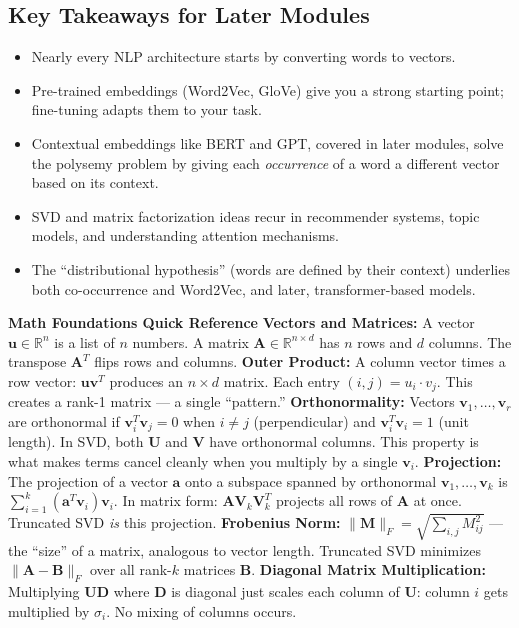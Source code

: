 \documentclass[11pt]{article}
\begin{document}
\subsection{Key Takeaways for Later Modules}
\begin{itemize}[nosep, leftmargin=*]
\item Nearly every NLP architecture starts by converting words to vectors.
\item Pre-trained embeddings (Word2Vec, GloVe) give you a strong starting point; fine-tuning adapts them to your task.
\item Contextual embeddings like BERT and GPT, covered in later modules, solve the polysemy problem by giving each \textit{occurrence} of a word a different vector based on its context.
\item SVD and matrix factorization ideas recur in recommender systems, topic models, and understanding attention mechanisms.
\item The ``distributional hypothesis'' (words are defined by their context) underlies both co-occurrence and Word2Vec, and later, transformer-based models.
\end{itemize}
\vspace{4pt}
{\small
\textbf{Math Foundations Quick Reference}
\textbf{Vectors and Matrices:} A vector $\mathbf{u} \in \mathbb{R}^n$ is a list of $n$ numbers. A matrix $\mathbf{A} \in \mathbb{R}^{n \times d}$ has $n$ rows and $d$ columns. The transpose $\mathbf{A}^T$ flips rows and columns.
\textbf{Outer Product:} A column vector times a row vector: $\mathbf{u}\mathbf{v}^T$ produces an $n \times d$ matrix. Each entry $(i,j) = u_i \cdot v_j$. This creates a rank-1 matrix --- a single ``pattern.''
\textbf{Orthonormality:} Vectors $\mathbf{v}_1, \ldots, \mathbf{v}_r$ are orthonormal if $\mathbf{v}_i^T \mathbf{v}_j = 0$ when $i \neq j$ (perpendicular) and $\mathbf{v}_i^T \mathbf{v}_i = 1$ (unit length). In SVD, both $\mathbf{U}$ and $\mathbf{V}$ have orthonormal columns. This property is what makes terms cancel cleanly when you multiply by a single $\mathbf{v}_i$.
\textbf{Projection:} The projection of a vector $\mathbf{a}$ onto a subspace spanned by orthonormal $\mathbf{v}_1, \ldots, \mathbf{v}_k$ is $\sum_{i=1}^{k} (\mathbf{a}^T \mathbf{v}_i) \mathbf{v}_i$. In matrix form: $\mathbf{A}\mathbf{V}_k\mathbf{V}_k^T$ projects all rows of $\mathbf{A}$ at once. Truncated SVD \textit{is} this projection.
\textbf{Frobenius Norm:} $\|\mathbf{M}\|_F = \sqrt{\sum_{i,j} M_{ij}^2}$ --- the ``size'' of a matrix, analogous to vector length. Truncated SVD minimizes $\|\mathbf{A} - \mathbf{B}\|_F$ over all rank-$k$ matrices $\mathbf{B}$.
\textbf{Diagonal Matrix Multiplication:} Multiplying $\mathbf{U}\mathbf{D}$ where $\mathbf{D}$ is diagonal just scales each column of $\mathbf{U}$: column $i$ gets multiplied by $\sigma_i$. No mixing of columns occurs.
}
\end{document}
